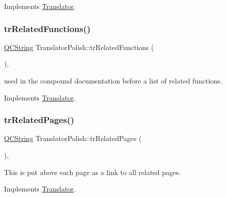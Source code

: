 Implements \mbox{\hyperlink{class_translator}{Translator}}.

\mbox{\label{class_translator_polish_a186ac7a8f63b630d82593fc27704df18}} 
\subsubsection{\texorpdfstring{trRelatedFunctions()}{trRelatedFunctions()}}
{\footnotesize\ttfamily \mbox{\hyperlink{class_q_c_string}{Q\+C\+String}} Translator\+Polish\+::tr\+Related\+Functions (\begin{DoxyParamCaption}{ }\end{DoxyParamCaption})\hspace{0.3cm}{\ttfamily [inline]}, {\ttfamily [virtual]}}

used in the compound documentation before a list of related functions. 

Implements \mbox{\hyperlink{class_translator}{Translator}}.

\mbox{\label{class_translator_polish_af2a7974597c3756f42cf593cadba6920}} 
\subsubsection{\texorpdfstring{trRelatedPages()}{trRelatedPages()}}
{\footnotesize\ttfamily \mbox{\hyperlink{class_q_c_string}{Q\+C\+String}} Translator\+Polish\+::tr\+Related\+Pages (\begin{DoxyParamCaption}{ }\end{DoxyParamCaption})\hspace{0.3cm}{\ttfamily [inline]}, {\ttfamily [virtual]}}

This is put above each page as a link to all related pages. 

Implements \mbox{\hyperlink{class_translator}{Translator}}.

\mbox{\label{class_translator_polish_aaa1a0b407fe4a4f1b499392e23fcde07}} 
